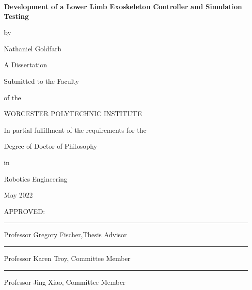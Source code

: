 \documentclass[12pt]{report}
\begin{document}
\newcommand{\brk}{\vspace*{0.18in}}

\thispagestyle{empty}

\begin{center}

\brk


   {\large 
	\textbf{
	Development of a Lower Limb Exoskeleton Controller and Simulation Testing
	}
   }


\brk
by

\brk
Nathaniel Goldfarb


\brk\brk
A Dissertation

\brk
Submitted to the Faculty

\brk
of the 

\brk
WORCESTER POLYTECHNIC INSTITUTE
	
\brk
In partial fulfillment of the requirements for the

\brk
Degree of Doctor of Philosophy

\brk
in

\brk
Robotics Engineering

\brk
May 2022

\end{center}

	
\vfill
APPROVED:

\vspace{0.25in}
\rule{3in}{0.8pt}

Professor Gregory Fischer,Thesis Advisor

\vspace{0.25in}
\rule{3in}{0.8pt}

Professor Karen Troy,  Committee Member


\vspace{0.25in}
\rule{3in}{0.8pt}

Professor Jing Xiao,  Committee Member
\end{document}
